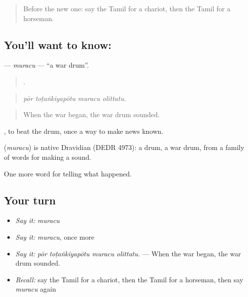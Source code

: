 \label{lesson:TA-C334-muracu}



\begin{quote}
Before the new one: say the Tamil for a chariot, then the Tamil for a horseman.
\end{quote}

\subsection*{You'll want to know: }
\textbf{} — \emph{muracu} — \textquotedblleft{}a war drum\textquotedblright{}.

\begin{quote}
   .
\end{quote}

\begin{quote}
\emph{pōr toṭaṅkiyapōtu muracu olittatu.}
\end{quote}

\begin{quote}
When the war began, the war drum sounded.
\end{quote}

 , to beat the drum, once a way to make news known.

\begin{cousinweb}
\textbf{} (\emph{muracu}) is native Dravidian (DEDR 4973): a drum, a war drum, from a family of words for making a sound.
\end{cousinweb}

\begin{grammarlens}[title={What you've built}]
One more word for telling what happened.
\end{grammarlens}

\subsection*{Your turn}
\begin{itemize}
\raggedright
  \item \emph{Say it:} \emph{muracu}
  \item \emph{Say it:} \emph{muracu}, once more
  \item \emph{Say it:} \emph{pōr toṭaṅkiyapōtu muracu olittatu.} — When the war began, the war drum sounded.
  \item \emph{Recall:} say the Tamil for a chariot, then the Tamil for a horseman, then say \emph{muracu} again
\end{itemize}


